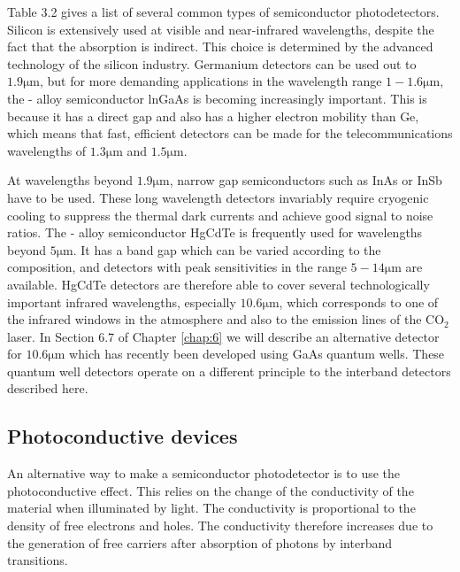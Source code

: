 \documentclass[12pt]{book}
\begin{document}
Table 3.2 gives a list of several common types of semiconductor photodetectors. Silicon is extensively used at visible and near-infrared wavelengths, despite the fact that the absorption is indirect. This choice is determined by the advanced technology of the silicon industry. Germanium detectors can be used out to $\mathrm{1.9\mu m}$, but for more demanding applications in the wavelength range $\mathrm{1-1.6\mu m}$, the \uppercase\expandafter{}-\uppercase\expandafter{} alloy semiconductor lnGaAs is becoming increasingly important. This is because it has a direct gap and also has a higher electron mobility than Ge, which means that fast, efficient detectors can be made for the telecommunications wavelengths of $\mathrm{1.3\mu m}$ and $\mathrm{1.5\mu m}$.

At wavelengths beyond $\mathrm{1.9\mu m}$, narrow gap semiconductors such as InAs or InSb have to be used. These long wavelength detectors invariably require cryogenic cooling to suppress the thermal dark currents and achieve good signal to noise ratios. The \uppercase\expandafter{}-\uppercase\expandafter{} alloy semiconductor HgCdTe is frequently used for wavelengths beyond $\mathrm{5\mu m}$. It has a band gap which can be varied according to the composition, and detectors with peak sensitivities in the range $\mathrm{5-14\mu m}$ are available. HgCdTe detectors are therefore able to cover several technologically important infrared wavelengths, especially $\mathrm{10.6\mu m}$, which corresponds to one of the infrared windows in the atmosphere and also to the emission lines of the $\mathrm{CO_2}$ laser. In Section 6.7 of Chapter \ref{chap:6} we will describe an alternative detector for $\mathrm{10.6\mu m}$ which has recently been developed using GaAs quantum wells. These quantum well detectors operate on a different principle to the interband detectors described here.

\subsection{Photoconductive devices}

An alternative way to make a semiconductor photodetector is to use the photoconductive effect. This relies on the change of the conductivity of the material when illuminated by light. The conductivity is proportional to the density of free electrons and holes. The conductivity therefore increases due to the generation of free carriers after absorption of photons by interband transitions.
\end{document}
